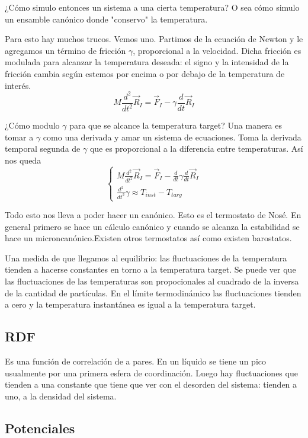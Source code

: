   ¿Cómo simulo entonces un sistema a una cierta temperatura? O sea cómo simulo un ensamble canónico donde "conservo" la temperatura.

  Para esto hay muchos trucos. Vemos uno. Partimos de la ecuación de Newton y le agregamos un término de fricción $\gamma$, proporcional a la velocidad. Dicha fricción es modulada para alcanzar la temperatura deseada: el signo y la intensidad de la fricción cambia según estemos por encima o por debajo de la temperatura de interés.
    $$M \frac{d^2}{dt^2} \vec{R}_I =\vec{F}_I - \gamma \frac{d}{dt} \vec{R}_I$$

  ¿Cómo modulo $\gamma$ para que se alcance la temperatura target? Una manera es tomar a $\gamma$ como una derivada y amar un sistema de ecuaciones. Toma la derivada temporal segunda de $\gamma$ que es proporcional a la diferencia entre temperaturas. Así nos queda
    $$\begin{cases}
      M \frac{d^2}{dt^2} \vec{R}_I =\vec{F}_I - \frac{d}{dt} \gamma \frac{d}{dt} \vec{R}_I \\
      \frac{d^2}{dt^2} \gamma \approx  T_{inst} - T_{targ}
    \end{cases}$$

  Todo esto nos lleva a poder hacer un canónico. Esto es el termostato de Nosé. En general primero se hace un cálculo canónico y cuando se alcanza la estabilidad se hace un microncanónico.Existen otros termostatos así como existen barostatos.

  Una medida de que llegamos al equilibrio: las fluctuaciones de la temperatura tienden a hacerse constantes en torno a la temperatura target. Se puede ver que las fluctuaciones de las temperaturas son propocionales al cuadrado de la inversa de la cantidad de partículas. En el límite termodinámico las fluctuaciones tienden a cero y la temperatura instantánea es igual a la temperatura target.

\subsection{RDF}

  Es una función de correlación de a pares. En un líquido se tiene un pico usualmente por una primera esfera de coordinación. Luego hay fluctuaciones que tienden a una constante que tiene que ver con el desorden del sistema: tienden a uno, a la densidad del sistema.

\subsection{Potenciales}

